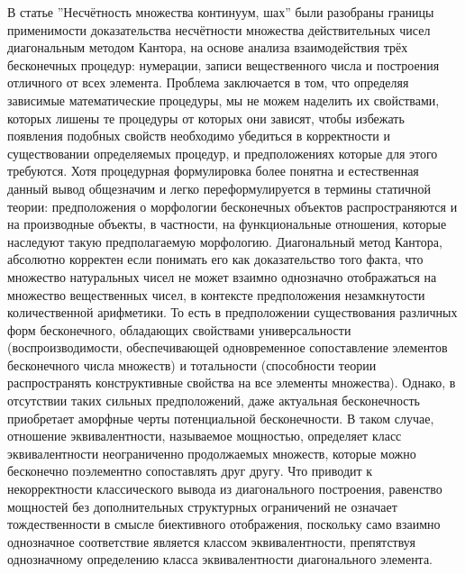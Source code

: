 \documentclass[12pt]{article}
\begin{document}
В статье ''Несчётность множества континуум, шах'' были разобраны границы применимости доказательства несчётности множества действительных чисел диагональным методом Кантора, на основе анализа взаимодействия трёх бесконечных процедур: нумерации, записи вещественного числа и построения отличного от всех элемента. Проблема заключается в том, что определяя зависимые математические процедуры, мы не можем наделить их свойствами, которых лишены те процедуры от которых они зависят, чтобы избежать появления подобных свойств необходимо убедиться в корректности и существовании определяемых процедур, и предположениях которые для этого требуются. Хотя процедурная формулировка более понятна и естественная данный вывод общезначим и легко переформулируется в термины статичной теории: предположения о морфологии бесконечных объектов распространяются и на производные объекты, в частности, на функциональные отношения, которые наследуют такую предполагаемую морфологию. Диагональный метод Кантора, абсолютно корректен если понимать его как доказательство того факта, что множество натуральных чисел не может взаимно однозначно отображаться на множество вещественных чисел, в контексте предположения незамкнутости количественной арифметики. То есть в предположении существования различных форм бесконечного, обладающих свойствами универсальности (воспроизводимости, обеспечивающей одновременное сопоставление элементов бесконечного числа множеств) и тотальности (способности теории распространять конструктивные свойства на все элементы множества). Однако, в отсутствии таких сильных предположений, даже актуальная бесконечность приобретает аморфные черты потенциальной бесконечности. В таком случае, отношение эквивалентности, называемое мощностью, определяет класс эквивалентности неограниченно продолжаемых множеств, которые можно бесконечно поэлементно сопоставлять друг другу. Что приводит к некорректности классического вывода из диагонального построения, равенство мощностей без дополнительных структурных ограничений не означает тождественности в смысле биективного отображения, поскольку само взаимно однозначное соответствие является классом эквивалентности, препятствуя однозначному определению класса эквивалентности диагонального элемента. 
\end{document}
